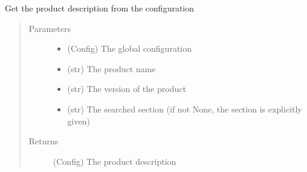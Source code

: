 \documentclass[a4paper,10pt,english]{sphinxmanual}
\begin{document}
\begin{fulllineitems}
\label{\detokenize{apidoc_src/src:src.product.get_product_section}}
Get the product description from the configuration
\begin{quote}\begin{description}
\item[{Parameters}] \leavevmode\begin{itemize}
\item {} 
 \textendash{} (Config) The global configuration

\item {} 
 \textendash{} (str) The product name

\item {} 
 \textendash{} (str) The version of the product

\item {} 
 \textendash{} (str) 
The searched section
(if not None, the section is explicitly given)

\end{itemize}

\item[{Returns}] \leavevmode
(Config) The product description

\end{description}\end{quote}

\end{fulllineitems}

\end{document}
